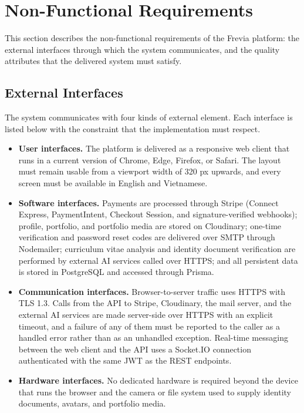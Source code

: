 \section{Non-Functional Requirements}

This section describes the non-functional requirements of the Frevia platform: the external interfaces through which the system communicates, and the quality attributes that the delivered system must satisfy.

\subsection{External Interfaces}

The system communicates with four kinds of external element. Each interface is listed below with the constraint that the implementation must respect.

\begin{itemize}
    \item \textbf{User interfaces.} The platform is delivered as a responsive web client that runs in a current version of Chrome, Edge, Firefox, or Safari. The layout must remain usable from a viewport width of 320 px upwards, and every screen must be available in English and Vietnamese.
    \item \textbf{Software interfaces.} Payments are processed through Stripe (Connect Express, PaymentIntent, Checkout Session, and signature-verified webhooks); profile, portfolio, and portfolio media are stored on Cloudinary; one-time verification and password reset codes are delivered over SMTP through Nodemailer; curriculum vitae analysis and identity document verification are performed by external AI services called over HTTPS; and all persistent data is stored in PostgreSQL and accessed through Prisma.
    \item \textbf{Communication interfaces.} Browser-to-server traffic uses HTTPS with TLS 1.3. Calls from the API to Stripe, Cloudinary, the mail server, and the external AI services are made server-side over HTTPS with an explicit timeout, and a failure of any of them must be reported to the caller as a handled error rather than as an unhandled exception. Real-time messaging between the web client and the API uses a Socket.IO connection authenticated with the same JWT as the REST endpoints.
    \item \textbf{Hardware interfaces.} No dedicated hardware is required beyond the device that runs the browser and the camera or file system used to supply identity documents, avatars, and portfolio media.
\end{itemize}

